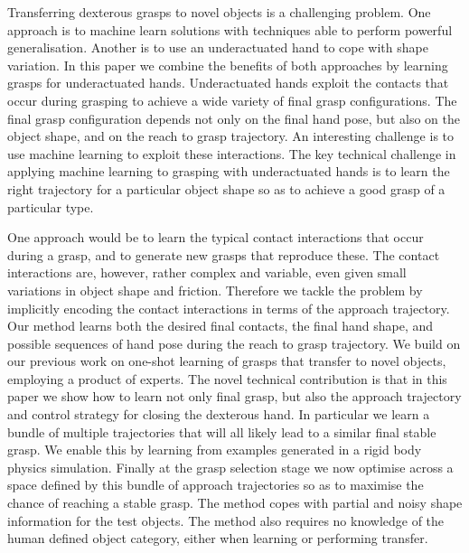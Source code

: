 Transferring dexterous grasps to novel objects is a challenging problem. One approach is to machine learn solutions with techniques able to perform powerful generalisation. Another is to use an underactuated hand to cope with shape variation. In this paper we combine the benefits of both approaches by learning grasps for underactuated hands. Underactuated hands exploit the contacts that occur during grasping to achieve a wide variety of final grasp configurations. The final grasp configuration depends not only on the final hand pose, but also on the object shape, and on the reach to grasp trajectory. An interesting challenge is to use machine learning to exploit these interactions. The key technical challenge in applying machine learning to grasping with underactuated hands is to learn the right trajectory for a particular object shape so as to achieve a good grasp of a particular type. 

One approach would be to learn the typical contact interactions that occur during a grasp, and to generate new grasps that reproduce these. The contact interactions are, however, rather complex and variable, even given small variations in object shape and friction. Therefore we tackle the problem by implicitly encoding the contact interactions in terms of the approach trajectory. Our method learns both the desired final contacts, the final hand shape, and possible sequences of hand pose during the reach to grasp trajectory. We build on our previous work on one-shot learning of grasps that transfer to novel objects, employing a product of experts. The novel technical contribution is that in this paper we show how to learn not only final grasp, but also the approach trajectory and control strategy for closing the dexterous hand. In particular we learn a bundle of multiple trajectories that will all likely lead to a similar final stable grasp. We enable this by learning from examples generated in a rigid body physics simulation. Finally at the grasp selection stage we now optimise across a space defined by this bundle of approach trajectories so as to maximise the chance of reaching a stable grasp. The method copes with partial and noisy shape information for the test objects. The method also requires no knowledge of the human defined object category, either when learning or performing transfer.

